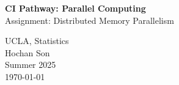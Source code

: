 \documentclass[11pt]{article}
\begin{document}





\newif\ifuselocaldir
\uselocaldirtrue
\uselocaldirfalse


\newcommand{\DXZ}{
\begin{flushright}
\vspace{-.4in}
 { \raisebox{0.30ex}{{\tiny D}}\hspace{0.008in}X\hspace{0.01in}\raisebox{0.30ex}{{\tiny Z}}     }
\end{flushright}
}


\newenvironment{myQuote}[2]%
               {\begin{list}{}{\leftmargin#1\rightmargin#2}\item{}}%
               {\end{list}}

\begin{myQuote}{2cm}{2cm}
\begin{center}
{\huge
\textbf{CI Pathway: Parallel Computing} \\[0.4cm]
Assignment: Distributed Memory Parallelism
} \\[0.4cm]
\end{center}
\end{myQuote}




\begin{myQuote}{3cm}{3cm}
{\normalsize
\begin{center}
UCLA, Statistics\\Hochan Son\\Summer 2025\\
\today
\end{center}
}
\end{myQuote}


\end{document}
